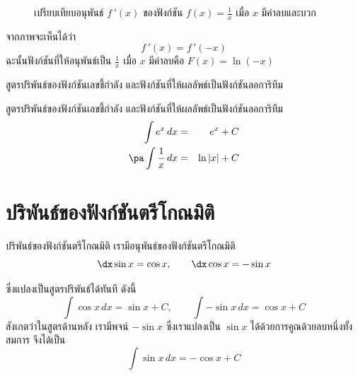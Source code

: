 \begin{frame}{}
\begin{figure}[h!]
\centering
{}
\caption{เปรียบเทียบอนุพันธ์ $f\,'(x)$ ของฟังก์ชัน $f(x) = \frac{1}{x}$ เมื่อ $x$ มีค่าลบและบวก}
\label{}
\end{figure}
จากภาพจะเห็นได้ว่า 
\[ f\,'(x) = f\,'(-x) \]
ฉะนั้นฟังก์ชันที่ให้อนุพันธ์เป็น $\frac{1}{x}$ เมื่อ $x$ มีค่าลบคือ $F(x) = \ln (-x)$
\end{frame}

\begin{frame}{สูตรปริพันธ์ของฟังก์ชันเลขชี้กำลัง และฟังก์ชันที่ให้ผลลัพธ์เป็นฟังก์ชันลอการิทึม}
\begin{thm}{สูตรปริพันธ์ของฟังก์ชันเลขชี้กำลัง และฟังก์ชันที่ให้ผลลัพธ์เป็นฟังก์ชันลอการิทึม}{}
\begin{eqnarray*}
\int e^x \, dx &=& e^x + C \\ \pa
\int \frac{1}{x} \, dx &=& \ln |x| + C
\end{eqnarray*}
\end{thm}
\end{frame}

\section[ตรีโกณ]{ปริพันธ์ของฟังก์ชันตรีโกณมิติ}
\frame{\sectionpage}

\begin{frame}[t]{ปริพันธ์ของฟังก์ชันตรีโกณมิติ}
เรามีอนุพันธ์ของฟังก์ชันตรีโกณมิติ
\[ \dx \sin x = \cos x, \qquad \dx \cos x = - \sin x\]
\begin{slide}
ซึ่งแปลงเป็นสูตรปริพันธ์ได้ทันที ดังนี้
\[ \int \cos x \, dx = \sin x + C, \qquad \int - \sin x \, dx = \cos x + C\]
สังเกตว่าในสูตรด้านหลัง เรามีพจน์ $- \sin x$ ซึ่งเราแปลงเป็น $\sin x$ ได้ด้วยการคูณด้วยลบหนึ่งทั้งสมการ จึงได้เป็น
\[\int \sin x \, dx = - \cos x + C\]
\end{slide}
\end{frame}

